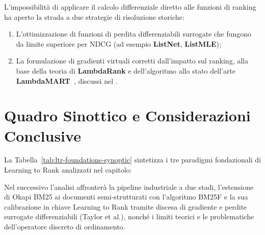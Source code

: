L'impossibilit\`a di applicare il calcolo differenziale diretto alle funzioni di ranking ha aperto la strada a due strategie di risoluzione storiche:
\begin{enumerate}
    \item L'ottimizzazione di funzioni di perdita differenziabili surrogate che fungono da limite superiore per NDCG (ad esempio \textbf{ListNet}, \textbf{ListMLE});
    \item La formulazione di gradienti virtuali corretti dall'impatto sul ranking, alla base della teoria di \textbf{LambdaRank} e dell'algoritmo allo stato dell'arte \textbf{LambdaMART}~\cite{burges2010}, discussi nel .
\end{enumerate}

\FloatBarrier
\section{Quadro Sinottico e Considerazioni Conclusive}
\label{sec:quadro-sinottico-conclusioni}

La Tabella~\ref{tab:ltr-foundations-synoptic} sintetizza i tre paradigmi fondazionali di Learning to Rank analizzati nel capitolo:

\begin{table}[H]
\centering
\small
{}
\caption{Quadro sinottico comparativo dei paradigmi di Learning to Rank.}
\label{tab:ltr-foundations-synoptic}
\end{table}

Nel successivo  l'analisi affronter\`a la pipeline industriale a due stadi, l'estensione di Okapi BM25 ai documenti semi-strutturati con l'algoritmo BM25F e la sua calibrazione in chiave Learning to Rank tramite discesa di gradiente e perdite surrogate differenziabili (Taylor et al.), nonch\'e i limiti teorici e le problematiche dell'operatore discreto di ordinamento.
